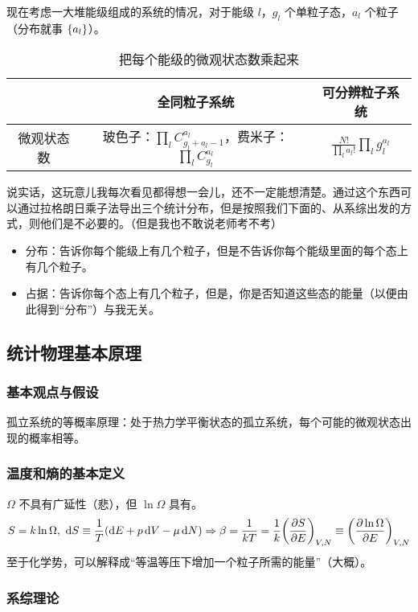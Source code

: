 现在考虑一大堆能级组成的系统的情况，对于能级 $l$，$g_l$ 个单粒子态，$a_l$ 个粒子（分布就事 $\qty{a_l}$）。
\begin{table}[H]
    \centering
    \begin{tabular}{|c|c|c|}
        \hline
        & 全同粒子系统 & 可分辨粒子系统 \\
        \hline
        微观状态数 & 玻色子：$\prod_l C_{g_l + a_l - 1}^{a_l}$，费米子：$\prod_l C_{g_l}^{a_l}$ & $\frac{N!}{\prod_{l} a_l!} \prod_{l} g_{l}^{a_{l}}$ \\
        \hline
    \end{tabular}
    \caption{把每个能级的微观状态数乘起来}
\end{table}
说实话，这玩意儿我每次看见都得想一会儿，还不一定能想清楚。通过这个东西可以通过拉格朗日乘子法导出三个统计分布，但是按照我们下面的、从系综出发的方式，则他们是不必要的。（但是我也不敢说老师考不考）

\begin{itemize}
    \item 分布：告诉你每个能级上有几个粒子，但是不告诉你每个能级里面的每个态上有几个粒子。
    \item 占据：告诉你每个态上有几个粒子，但是，你是否知道这些态的能量（以便由此得到“分布”）与我无关。
\end{itemize}

\subsection{统计物理基本原理}

\subsubsection{基本观点与假设}

孤立系统的等概率原理：处于热力学平衡状态的孤立系统，每个可能的微观状态出现的概率相等。

\subsubsection{温度和熵的基本定义}

$\Omega$ 不具有广延性（悲），但 $\ln{\Omega}$ 具有。
\[
S = k \ln{\Omega},\ \dd{S} \equiv \frac{1}{T} \qty(\dd{E} + p \dd{V} - \mu \dd{N}) \Rightarrow \beta = \frac{1}{k T} = \frac{1}{k} \qty(\pdv{S}{E})_{V, N} \equiv \qty(\pdv{\ln{\Omega}}{E})_{V, N}
\]
至于化学势，可以解释成“等温等压下增加一个粒子所需的能量”（大概）。

\subsubsection{系综理论}

